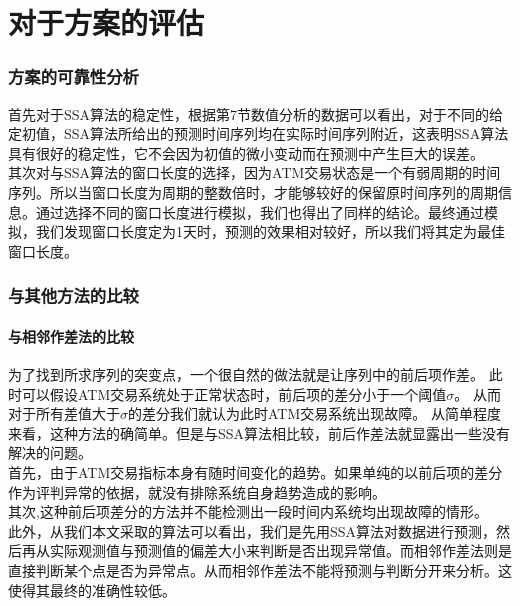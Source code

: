 \documentclass[a4paper]{article}
\begin{document}
\part{对于方案的评估}
\section{方案的可靠性分析}
\indent 首先对于SSA算法的稳定性，根据第7节数值分析的数据可以看出，对于不同的给定初值，SSA算法所给出的预测时间序列均在实际时间序列附近，这表明SSA算法具有很好的稳定性，它不会因为初值的微小变动而在预测中产生巨大的误差。\\
\indent 其次对与SSA算法的窗口长度的选择，因为ATM交易状态是一个有弱周期的时间序列。所以当窗口长度为周期的整数倍时，才能够较好的保留原时间序列的周期信息。通过选择不同的窗口长度进行模拟，我们也得出了同样的结论。最终通过模拟，我们发现窗口长度定为1天时，预测的效果相对较好，所以我们将其定为最佳窗口长度。
\section{与其他方法的比较}
\subsection{与相邻作差法的比较}
\indent 为了找到所求序列的突变点，一个很自然的做法就是让序列中的前后项作差。
此时可以假设ATM交易系统处于正常状态时，前后项的差分小于一个阈值$\sigma$。
从而对于所有差值大于$\sigma$的差分我们就认为此时ATM交易系统出现故障。
从简单程度来看，这种方法的确简单。但是与SSA算法相比较，前后作差法就显露出一些没有解决的问题。\\
\indent 首先，由于ATM交易指标本身有随时间变化的趋势。如果单纯的以前后项的差分作为评判异常的依据，就没有排除系统自身趋势造成的影响。\\
\indent 其次,这种前后项差分的方法并不能检测出一段时间内系统均出现故障的情形。 \\
\indent 此外，从我们本文采取的算法可以看出，我们是先用SSA算法对数据进行预测，然后再从实际观测值与预测值的偏差大小来判断是否出现异常值。而相邻作差法则是直接判断某个点是否为异常点。从而相邻作差法不能将预测与判断分开来分析。这使得其最终的准确性较低。
\end{document}
